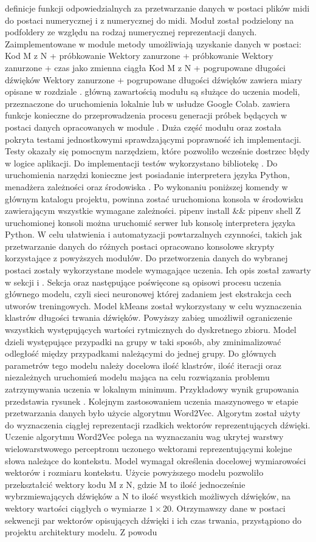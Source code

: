 definicje funkcji odpowiedzialnych za przetwarzanie danych w postaci plików midi do postaci numerycznej i z numerycznej do midi. Moduł został podzielony na podfoldery ze względu na rodzaj numerycznej reprezentacji danych. Zaimplementowane w module metody umożliwiają uzyskanie danych w postaci:  Kod  M\,\,z\,\,N + próbkowanie  Wektory zanurzone + próbkowanie  Wektory zanurzone + czas jako zmienna ciągła  Kod  M\,\,z\,\,N + pogrupowane długości dźwięków  Wektory zanurzone + pogrupowane długości dźwięków   zawiera miary opisane w rozdziale .   główną zawartością modułu są  służące do uczenia modeli, przeznaczone do uruchomienia lokalnie lub w usłudze Google Colab.   zawiera funkcje konieczne do przeprowadzenia procesu generacji próbek będących w postaci danych opracowanych w module . Duża część modułu  oraz  została pokryta testami jednostkowymi sprawdzającymi poprawność ich implementacji.  Testy okazały się pomocnym narzędziem, które pozwoliło wcześnie dostrzec błędy w logice aplikacji. Do implementacji testów wykorzystano bibliotekę . Do uruchomienia narzędzi konieczne jest posiadanie interpretera języka Python, menadżera zależności  oraz środowiska . Po wykonaniu poniższej komendy w głównym katalogu projektu, powinna zostać uruchomiona konsola w środowisku zawierającym wszystkie wymagane zależności. pipenv install && pipenv shell Z uruchomionej konsoli można uruchomić serwer  lub konsolę interpretera języka Python. W celu ułatwienia i automatyzacji powtarzalnych czynności, takich jak przetwarzanie danych do różnych postaci opracowano konsolowe skrypty korzystające z powyższych modułów. Do przetworzenia danych do wybranej postaci zostały wykorzystane modele wymagające uczenia. Ich opis został zawarty w sekcji  i . Sekcja  oraz następujące poświęcone są opisowi procesu uczenia głównego modelu, czyli sieci neuronowej której  zadaniem jest ekstrakcja cech utworów treningowych. Model kMeans został wykorzystany w celu wyznaczenia klastrów długości trwania dźwięków. Powyższy zabieg umożliwił ograniczenie wszystkich występujących  wartości rytmicznych do dyskretnego zbioru.  Model dzieli występujące przypadki na grupy w taki sposób, aby zminimalizować odległość  między przypadkami należącymi do jednej grupy. Do głównych parametrów tego modelu należy docelowa ilość klastrów, ilość iteracji oraz niezależnych uruchomień modelu mająca na celu rozwiązania problemu zatrzymywania uczenia w lokalnym minimum. Przykładowy wynik grupowania przedstawia rysunek . Kolejnym zastosowaniem uczenia maszynowego w etapie przetwarzania danych było użycie algorytmu Word2Vec. Algorytm  został użyty do wyznaczenia ciągłej reprezentacji rzadkich wektorów reprezentujących dźwięki. Uczenie algorytmu Word2Vec polega na wyznaczaniu wag ukrytej warstwy wielowarstwowego perceptronu uczonego wektorami reprezentującymi kolejne słowa należące do kontekstu. Model wymagał określenia docelowej wymiarowości wektorów i rozmiaru kontekstu.  Użycie powyższego modelu pozwoliło przekształcić  wektory kodu  M\,\,z\,\,N, gdzie M to ilość jednocześnie wybrzmiewających dźwięków a N to ilość wsystkich możliwych dźwięków, na wektory wartości ciągłych o wymiarze \(1 \times 20\). Otrzymawszy dane w postaci sekwencji par wektorów opisujących dźwięki i ich czas trwania, przystąpiono do projektu architektury modelu. Z powodu 